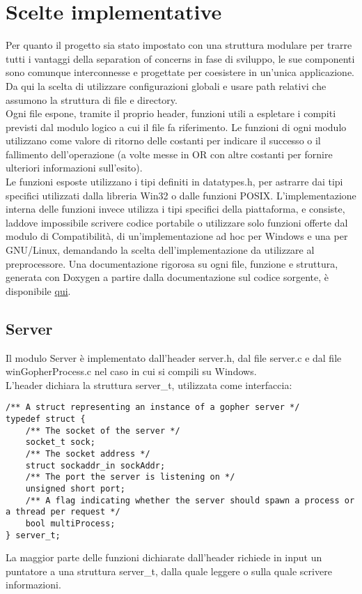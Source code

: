 \documentclass{article}
\begin{document}
\newpage


\section{Scelte implementative}

Per quanto il progetto sia stato impostato con una struttura modulare per trarre tutti i vantaggi della
separation of concerns in fase di sviluppo, le sue componenti sono comunque interconnesse e progettate per coesistere 
in un'unica applicazione. Da qui la scelta di utilizzare configurazioni globali 
e usare path relativi che assumono la struttura di file e directory.\\

Ogni file espone, tramite il proprio header, funzioni utili a espletare
i compiti previsti dal modulo logico a cui il file fa riferimento. Le funzioni di ogni modulo
utilizzano come valore di ritorno delle costanti per indicare il successo o il fallimento dell'operazione (a volte
messe in OR con altre costanti per fornire ulteriori informazioni sull'esito).
\\Le funzioni esposte utilizzano i tipi definiti in datatypes.h, per astrarre dai tipi specifici utilizzati
dalla libreria Win32 o dalle funzioni POSIX. L'implementazione interna delle funzioni invece
 utilizza i tipi specifici della piattaforma, e consiste, laddove impossibile scrivere codice portabile o utilizzare solo funzioni offerte dal 
modulo di Compatibilità, di un'implementazione ad hoc per Windows e una per GNU/Linux, demandando la scelta dell'implementazione
da utilizzare al preprocessore.
Una documentazione rigorosa su ogni file, funzione e struttura, generata con Doxygen a partire dalla 
documentazione sul codice sorgente, è disponibile \href{html/index.html}{qui}. 

\subsection{Server}
Il modulo Server è implementato dall'header server.h, dal file server.c e dal file winGopherProcess.c 
nel caso in cui si compili su Windows.\\
L'header dichiara la struttura server\_t, utilizzata come interfaccia:
\begin{lstlisting}
/** A struct representing an instance of a gopher server */
typedef struct {
    /** The socket of the server */
    socket_t sock;
    /** The socket address */
    struct sockaddr_in sockAddr;
    /** The port the server is listening on */
    unsigned short port;
    /** A flag indicating whether the server should spawn a process or a thread per request */
    bool multiProcess;
} server_t;
\end{lstlisting}
La maggior parte delle funzioni dichiarate dall'header richiede in input
un puntatore a una struttura server\_t, dalla quale leggere o sulla quale scrivere informazioni.
\end{document}

